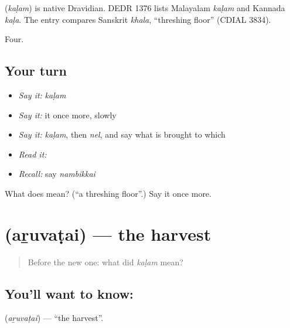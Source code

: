 \begin{cousinweb}
\textbf{} (\emph{kaḷam}) is native Dravidian. DEDR 1376 lists Malayalam \emph{kaḷam} and Kannada \emph{kaḷa}. The entry compares Sanskrit \emph{khala}, \textquotedblleft{}threshing floor\textquotedblright{} (CDIAL 3834).
\end{cousinweb}

\begin{grammarlens}[title={What you've built}]
Four.
\end{grammarlens}

\subsection*{Your turn}
\begin{itemize}
\raggedright
  \item \emph{Say it:} \emph{kaḷam}
  \item \emph{Say it:} it once more, slowly
  \item \emph{Say it:} \emph{kaḷam}, then \emph{nel}, and say what is brought to which
  \item \emph{Read it:} \textbf{}
  \item \emph{Recall:} say \emph{nambikkai}
\end{itemize}

\begin{tcolorbox}[breakable,colback=teal!4,colframe=teal!35!black,title={Before you move on}]
What does  mean? (\textquotedblleft{}a threshing floor\textquotedblright{}.) Say it once more.
\end{tcolorbox}
\section[\texorpdfstring{\ta{அறுவடை} (aṟuvaṭai)}{அறுவடை (aṟuvaṭai)}]{ (aṟuvaṭai) — the harvest}

\label{lesson:TA-C64-harvest}



\begin{quote}
Before the new one: what did \emph{kaḷam} mean?
\end{quote}

\subsection*{You'll want to know: }
\textbf{} (\emph{aṟuvaṭai}) — \textquotedblleft{}the harvest\textquotedblright{}.

